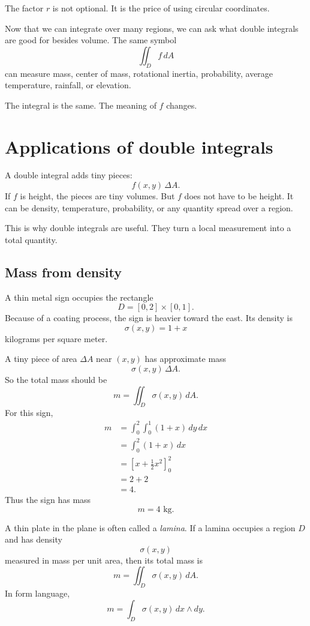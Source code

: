 The factor \(r\) is not optional.  It is the price of using circular coordinates.

Now that we can integrate over many regions, we can ask what double integrals are
good for besides volume.  The same symbol
\[
    \iint_D f\,dA
\]
can measure mass, center of mass, rotational inertia, probability, average temperature,
rainfall, or elevation.

The integral is the same.  The meaning of \(f\) changes.

\section{Applications of double integrals}
\label{sec:10.6}

A double integral adds tiny pieces:
\[
    f(x,y)\,\Delta A.
\]
If \(f\) is height, the pieces are tiny volumes.  But \(f\) does not have to be height.
It can be density, temperature, probability, or any quantity spread over a region.

This is why double integrals are useful.  They turn a local measurement into a total
quantity.

\subsection{Mass from density}

A thin metal sign occupies the rectangle
\[
    D=[0,2]\times[0,1].
\]
Because of a coating process, the sign is heavier toward the east.  Its density is
\[
    \sigma(x,y)=1+x
\]
kilograms per square meter.

A tiny piece of area \(\Delta A\) near \((x,y)\) has approximate mass
\[
    \sigma(x,y)\,\Delta A.
\]
So the total mass should be
\[
    m=\iint_D \sigma(x,y)\,dA.
\]
For this sign,
\[
\begin{aligned}
    m
    &=
    \int_0^2\int_0^1 (1+x)\,dy\,dx\\
    &=
    \int_0^2 (1+x)\,dx\\
    &=
    \left[
        x+\frac12x^2
    \right]_0^2\\
    &=
    2+2\\
    &=
    4.
\end{aligned}
\]
Thus the sign has mass
\[
\boxed{
    m=4\text{ kg}.
}
\]

\begin{definition}
A thin plate in the plane is often called a \emph{lamina}.  If a lamina occupies a region
\(D\) and has density
\[
    \sigma(x,y)
\]
measured in mass per unit area, then its total mass is
\[
\boxed{
    m=\iint_D \sigma(x,y)\,dA.
}
\]
In form language,
\[
\boxed{
    m=\int_D \sigma(x,y)\,dx\wedge dy.
}
\]
\end{definition}

